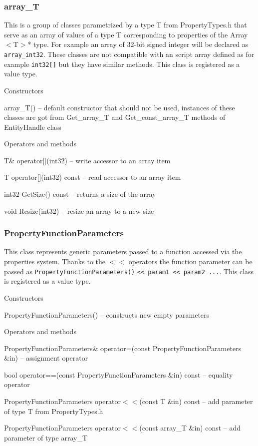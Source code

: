 \documentclass[12pt, a4paper]{article}
\newenvironment{titled-itemize}[1]
{
\vspace{5mm}
\noindent\textbf{#1}
\begin{itemize}
}
{
\end{itemize}
}
\begin{document}
\subsubsection{array\_T}

This is a group of classes parametrized by a type T from PropertyTypes.h that serve as an array of values of a type T corresponding to properties of the Array$<$T$>$* type. For example an array of 32-bit signed integer will be declared as \verb/array_int32/. These classes are not compatible with an script array defined as for example \verb/int32[]/ but they have similar methods. This class is registered as a value type.

\begin{titled-itemize}{Constructors}
  \item array\_T() -- default constructor that should not be used, instances of these classes are got from Get\_array\_T and Get\_const\_array\_T methods of EntityHandle class
\end{titled-itemize}

\begin{titled-itemize}{Operators and methods}
  \item T\& operator[](int32) -- write accessor to an array item
  \item T operator[](int32) const -- read accessor to an array item
  \item int32 GetSize() const -- returns a size of the array
  \item void Resize(int32) -- resize an array to a new size
\end{titled-itemize}

\subsubsection{PropertyFunctionParameters}

This class represents generic parameters passed to a function accessed via the properties system. Thanks to the $<<$ operators the function parameter can be passed as \verb/PropertyFunctionParameters()/ \verb/<< param1 << param2 .../. This class is registered as a value type.

\begin{titled-itemize}{Constructors}
  \item PropertyFunctionParameters() -- constructs new empty parameters
\end{titled-itemize}

\begin{titled-itemize}{Operators and methods}
  \item PropertyFunctionParameters\& operator=(const PropertyFunctionParameters \&in) -- assignment operator
  \item bool operator==(const PropertyFunctionParameters \&in) const -- e\-qua\-li\-ty operator
  \item PropertyFunctionParameters operator$<<$(const T \&in) const -- add parameter of type T from PropertyTypes.h
  \item PropertyFunctionParameters operator$<<$(const array\_T \&in) const -- add parameter of type array\_T
\end{titled-itemize}
\end{document}
